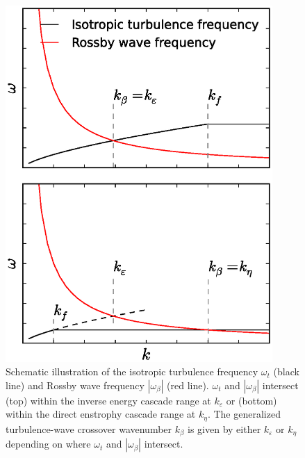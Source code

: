 \documentclass{jfm}
\begin{document}
\begin{figure}
\begin{center}
\includegraphics[width=4in]{crossover_scale_illustrate}\caption{Schematic illustration of the isotropic turbulence frequency $\omega_{t}$
(black line) and Rossby wave frequency $|\omega_{\beta}|$ (red line).
$\omega_{t}$ and $|\omega_{\beta}|$ intersect (top) within the
inverse energy cascade range at $k_{\varepsilon}$ or (bottom) within the direct enstrophy
cascade range at $k_{\eta}$. The generalized turbulence-wave crossover wavenumber
$k_{\beta}$ is given by either $k_{\varepsilon}$ or $k_{\eta}$
depending on where $\omega_{t}$ and $|\omega_{\beta}|$ intersect.}
\label{crossover_illustrate}
\end{center}
\end{figure}
\end{document}
